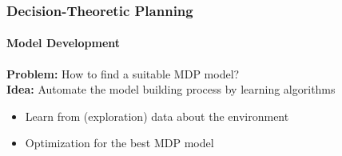 \begin{frame}[t]
\frametitle{Decision-Theoretic Planning}
\framesubtitle{Model Development}
\vspace{8pt}
\textcolor{tudBlack}{\textbf{Problem:}} How to find a suitable MDP model?\\
\vspace{14pt}
\textcolor{tudBlack}{\textbf{Idea:}} Automate the model building process by learning algorithms 
\begin{itemize}
	\item Learn from (exploration) data about the environment
	\item Optimization for the best MDP model
\end{itemize}

\end{frame}